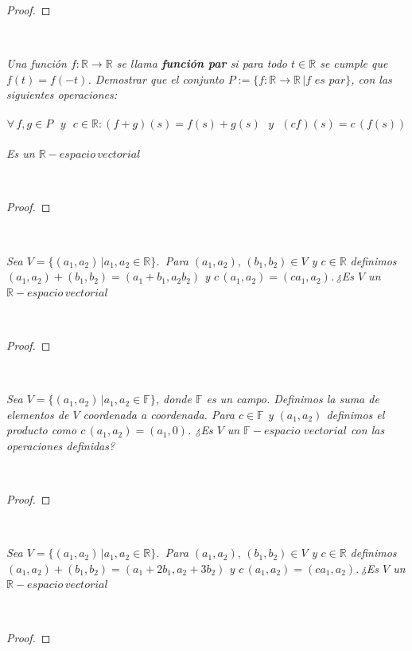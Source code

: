 \documentclass[11pt,letterpaper]{article}
\begin{document}
\begin{proof}
    
\end{proof}\,\\
\begin{tcolorbox}[
	title = \textcolor{black}{\textcolor{white}{Problema 6}},]
\textit{Una funci\'on $f:\mathbb{R}\rightarrow \mathbb{R}$ se llama \textbf{funci\'on par} si para todo $t\in \mathbb{R}$ se cumple que
$f(t)=f(-t)$. Demostrar que el conjunto $P:=\{f:\mathbb{R}\rightarrow\mathbb{R}\,| f\,\,es \,\,par\}$, con las siguientes operaciones:\,\\
\,\\
\begin{equation*}
    \forall\,f,g \in P\,\,\,\,y\,\,\,\,c\in \mathbb{R}:(f+g)(s)=f(s)+g(s)\,\,\,\,y\,\,\,\,(cf)(s)=c\,(f(s))
\end{equation*}\,\\
Es un $\mathbb{R}-espacio\,vectorial$ 
}
\end{tcolorbox}\,\\
\begin{proof}
    
\end{proof}\,\\
\begin{tcolorbox}[
	title = \textcolor{black}{\textcolor{white}{Problema 7}},]
\textit{Sea $V=\{(a_1,a_2)\,|a_1,a_2\in \mathbb{R}\}$. \,Para $(a_1,a_2),\,(b_1,b_2)\in V$ y $c\in \mathbb{R}$
definimos $(a_1,a_2)+(b_1,b_2)=(a_1+b_1,a_2b_2)$ y $c\,(a_1,a_2)=(ca_1,a_2)$.\,¿Es $V$ un $\mathbb{R}-espacio\,vectorial$
}
\end{tcolorbox}\,\\
\begin{proof}
    
\end{proof}\,\\
\begin{tcolorbox}[
	title = \textcolor{black}{\textcolor{white}{Problema 8}},]
\textit{Sea $V=\{(a_1,a_2)\,|a_1,a_2\in \mathbb{F}\}$, donde $\mathbb{F}$ es un campo. Definimos la suma de elementos de $V$ 
coordenada a coordenada. Para $c\in \mathbb{F}$ y $(a_1,a_2)$ definimos el producto como $c\,(a_1,a_2)=(a_1,0)$. ¿Es $V$
un $\mathbb{F}-espacio\,\,vectorial$ con las operaciones definidas?}
\end{tcolorbox}\,\\
\begin{proof}
    
\end{proof}\,\\

\begin{tcolorbox}[
	title = \textcolor{black}{\textcolor{white}{Problema 9}},]
\textit{Sea $V=\{(a_1,a_2)\,|a_1,a_2\in \mathbb{R}\}$. \,Para $(a_1,a_2),\,(b_1,b_2)\in V$ y $c\in \mathbb{R}$
definimos $(a_1,a_2)+(b_1,b_2)=(a_1+2b_1,a_2+3b_2)$ y $c\,(a_1,a_2)=(ca_1,a_2)$.\,¿Es $V$ un $\mathbb{R}-espacio\,vectorial$
}
\end{tcolorbox}\,\\
\begin{proof}
    
\end{proof}\,\\
\end{document}
